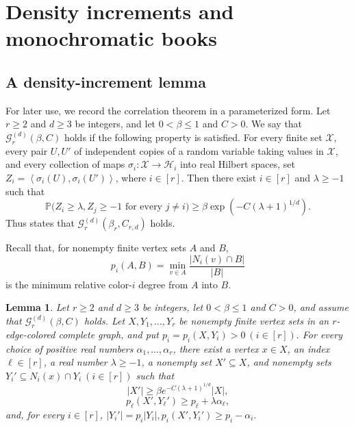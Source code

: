 \documentclass[twoside,12pt]{article}
\newtheorem{lemma}[theorem]{Lemma}
\theoremstyle{definition}
\theoremstyle{remark}
\newcommand{\Pp}{\mathbb P}
\newcommand{\1}{\mathbf 1}
\newcommand{\ip}[2]{\left\langle #1,#2\right\rangle}
\begin{document}
\section{Density increments and monochromatic books}\label{sec:book}

\subsection{A density-increment lemma}\label{sec:density}

For later use, we record the correlation theorem in a parameterized form.
Let $r\ge2$ and $d\ge3$ be integers, and let $0<\beta\le1$ and $C>0$.
We say that $\mathcal G_r^{(d)}(\beta,C)$ holds if the following property is
satisfied. For every finite set $\mathcal X$, every pair $U,U'$ of
independent copies of a random variable taking values in $\mathcal X$, and
every collection of maps $\sigma_i:\mathcal X\to\mathcal H_i$ into real
Hilbert spaces, set
$
 Z_i=\ip{\sigma_i(U)}{\sigma_i(U')}
$, where $i\in[r].
$
Then there exist $i\in[r]$ and $\lambda\ge-1$ such that
\[
 \Pp\bigl(
  Z_i\ge\lambda,
  Z_j\ge-1\text{ for every }j\ne i
 \bigr)
 \ge\beta\exp\!\left(-C(\lambda+1)^{1/d}\right).
\]
Thus  states that
$\mathcal G_r^{(d)}(\beta_r,C_{r,d})$ holds.

Recall that, for nonempty finite vertex sets $A$ and $B$,
\[
 p_i(A,B)=\min_{v\in A}\frac{|N_i(v)\cap B|}{|B|}
\]
is the minimum relative color-$i$ degree from $A$ into $B$.

\begin{lemma}\label{lem:key}
Let $r\ge2$ and $d\ge3$ be integers, let $0<\beta\le1$ and $C>0$, and
assume that $\mathcal G_r^{(d)}(\beta,C)$ holds. Let
$X,Y_1,\ldots,Y_r$ be nonempty finite vertex sets in an $r$-edge-colored
complete graph, and put
$
 p_i=p_i(X,Y_i)>0
~(i\in[r]).
$
For every choice of positive real numbers $\alpha_1,\ldots,\alpha_r$, there
exist a vertex $x\in X$, an index $\ell\in[r]$, a real number
$\lambda\ge-1$, a nonempty set $X'\subseteq X$, and nonempty sets
$
 Y_i'\subseteq N_i(x)\cap Y_i
~(i\in[r])
$
such that
\begin{equation}\label{eq:key-X}
 |X'|\ge\beta e^{-C(\lambda+1)^{1/d}}|X|,
\end{equation}
\begin{equation}\label{eq:key-selected}
 p_\ell(X',Y_\ell')\ge p_\ell+\lambda\alpha_\ell,
\end{equation}
and, for every $i\in[r]$,
$
 |Y_i'|=p_i|Y_i|,
 p_i(X',Y_i')\ge p_i-\alpha_i.
$
\end{lemma}
\end{document}
